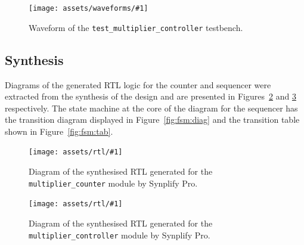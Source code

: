 \documentclass[a4paper]{article}
\newcommand{\waveformfigure}[2]{
  \begin{figure}[bp]
    \centering\texttt{[image: assets/waveforms/\#1]}
    \caption{#2}
    \label{fig:wave:#1}
  \end{figure}
}
\newcommand{\rtlfigure}[2]{
  \begin{figure}[bp]
    \centering\texttt{[image: assets/rtl/\#1]}
    \caption{#2}
    \label{fig:rtl:#1}
  \end{figure}
}
\begin{document}
\waveformfigure{test_multiplier_controller}{Waveform of the \texttt{test\_multiplier\_controller} testbench.}

\subsection{Synthesis}
\label{sec:seq:synth}

Diagrams of the generated RTL logic for the counter and sequencer were extracted from the synthesis of the design and are presented in Figures~\ref{fig:rtl:multiplier_counter} and \ref{fig:rtl:multiplier_controller} respectively. The state machine at the core of the diagram for the sequencer has the transition diagram displayed in Figure~\ref{fig:fsm:diag} and the transition table shown in Figure~\ref{fig:fsm:tab}.

\rtlfigure{multiplier_counter}{Diagram of the synthesised RTL generated for the \texttt{multiplier\_counter} module by Synplify Pro.}

\rtlfigure{multiplier_controller}{Diagram of the synthesised RTL generated for the \texttt{multiplier\_controller} module by Synplify Pro.}
\end{document}
